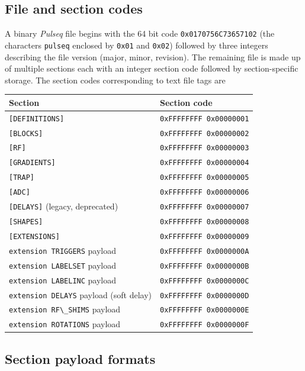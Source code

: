 \documentclass{article}
\begin{document}
\subsection{File and section codes}

A binary \textit{Pulseq} file begins with the 64 bit code \verb.0x0170756C73657102. (the characters \verb.pulseq. enclosed by \verb.0x01. and \verb.0x02.)  followed by three integers describing the file version (major, minor, revision). The remaining file is made up of multiple sections each with an integer section code followed by section-specific storage. The section codes corresponding to text file tags are

\begin{center}
\begin{tabular}{ll}
\toprule
Section & Section code \\
\midrule
\verb.[DEFINITIONS]. & \verb.0xFFFFFFFF 0x00000001. \\
\verb.[BLOCKS]. & \verb.0xFFFFFFFF 0x00000002. \\
\verb.[RF]. & \verb.0xFFFFFFFF 0x00000003. \\
\verb.[GRADIENTS]. & \verb.0xFFFFFFFF 0x00000004. \\
\verb.[TRAP]. & \verb.0xFFFFFFFF 0x00000005. \\
\verb.[ADC]. & \verb.0xFFFFFFFF 0x00000006. \\
\verb.[DELAYS]. (legacy, deprecated) & \verb.0xFFFFFFFF 0x00000007. \\
\verb.[SHAPES]. & \verb.0xFFFFFFFF 0x00000008. \\
\verb.[EXTENSIONS]. & \verb.0xFFFFFFFF 0x00000009. \\
\verb.extension TRIGGERS. payload & \verb.0xFFFFFFFF 0x0000000A. \\
\verb.extension LABELSET. payload & \verb.0xFFFFFFFF 0x0000000B. \\
\verb.extension LABELINC. payload & \verb.0xFFFFFFFF 0x0000000C. \\
\verb.extension DELAYS. payload (soft delay) & \verb.0xFFFFFFFF 0x0000000D. \\
\verb.extension RF\_SHIMS. payload & \verb.0xFFFFFFFF 0x0000000E. \\
\verb.extension ROTATIONS. payload & \verb.0xFFFFFFFF 0x0000000F. \\
\bottomrule
\end{tabular}
\end{center}

\subsection{Section payload formats}
\end{document}
